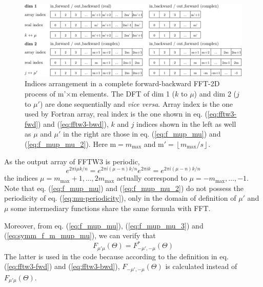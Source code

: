 \begin{figure}[h]
\centering{}%
\noindent\begin{minipage}[t]{1\textwidth}%
\begin{center}
\includegraphics[width=1\textwidth]{_figure/fftw3_indices}
\par\end{center}
\begin{center}
\caption[Indices arrangement in a complete forward-backward FFT-2D process
of m'$\times$m elements]{Indices arrangement in a complete forward-backward FFT-2D process
of m'$\times$m elements. The DFT of dim 1 ($k$ to $\mu$) and dim
2 ($j$ to $\mu'$) are done sequentially and \emph{vice versa}. Array
index is the one used by Fortran array, real index is the one shown
in eq. (\ref{eq:fftw3-fwd}) and (\ref{eq:fftw3-bwd}), $k$ and $j$
indices shown in the left as well as $\mu$ and $\mu'$ in the right
are those in eq. (\ref{eq:f_mup_mu}) and (\ref{eq:f_mup_mu_2}).
Here $\mathrm{m}=m_{\mathrm{max}}$ and $\mathrm{m}'=\left\lfloor m_{\mathrm{max}}/s\right\rfloor $.
\label{fig:FFTW3-2D-indices}}
\par\end{center}%
\end{minipage}
\end{figure}

As the output array of FFTW3 is periodic,
\begin{equation}
e^{2\pi i\mu k/n}=e^{2\pi i(\mu-n)k/n}e^{2\pi ik}=e^{2\pi i(\mu-n)k/n}\label{eq:mu-periodicity}
\end{equation}
the indices $\mu=m_{\mathrm{max}}+1,\ldots,2m_{\mathrm{max}}$ actually
correspond to $\mu=-m_{\mathrm{max}},\ldots,-1$. Note that eq. (\ref{eq:f_mup_mu})
and (\ref{eq:f_mup_mu_2}) do not possess the periodicity of eq. (\ref{eq:mu-periodicity}),
only in the domain of definition of $\mu'$ and $\mu$ some intermediary
functions share the same formula with \acs{FFT}.

Moreover, from eq. (\ref{eq:f_mup_mu}), (\ref{eq:f_mup_mu_3}) and
(\ref{eq:symm_f_m_mup_mu}), we can verify that
\begin{equation}
F_{\mu'\mu}(\Theta)=F_{-\mu',-\mu}^{*}(\Theta)
\end{equation}
The latter is used in the code because according to the definition
in eq. (\ref{eq:fftw3-fwd}) and (\ref{eq:fftw3-bwd}), $F_{-\mu',-\mu}(\Theta)$
is calculated instead of $F_{\mu'\mu}(\Theta)$.

